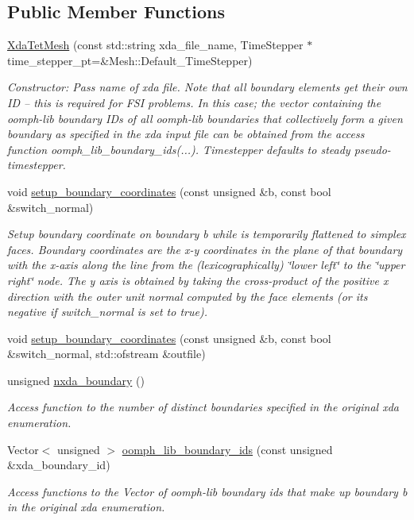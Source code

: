 \subsection*{Public Member Functions}
\begin{DoxyCompactItemize}
\item 
\hyperlink{classoomph_1_1XdaTetMesh_a4cea32a11d0899ac230de66899e503d1}{Xda\+Tet\+Mesh} (const std\+::string xda\+\_\+file\+\_\+name, Time\+Stepper $\ast$time\+\_\+stepper\+\_\+pt=\&Mesh\+::\+Default\+\_\+\+Time\+Stepper)
\begin{DoxyCompactList}\small\item\em Constructor\+: Pass name of xda file. Note that all boundary elements get their own ID -- this is required for F\+SI problems. In this case; the vector containing the oomph-\/lib boundary I\+Ds of all oomph-\/lib boundaries that collectively form a given boundary as specified in the xda input file can be obtained from the access function oomph\+\_\+lib\+\_\+boundary\+\_\+ids(...). Timestepper defaults to steady pseudo-\/timestepper. \end{DoxyCompactList}\item 
void \hyperlink{classoomph_1_1XdaTetMesh_a3a09ba1d3e29133dd032519ced703815}{setup\+\_\+boundary\+\_\+coordinates} (const unsigned \&b, const bool \&switch\+\_\+normal)
\begin{DoxyCompactList}\small\item\em Setup boundary coordinate on boundary b while is temporarily flattened to simplex faces. Boundary coordinates are the x-\/y coordinates in the plane of that boundary with the x-\/axis along the line from the (lexicographically) \char`\"{}lower left\char`\"{} to the \char`\"{}upper right\char`\"{} node. The y axis is obtained by taking the cross-\/product of the positive x direction with the outer unit normal computed by the face elements (or its negative if switch\+\_\+normal is set to true). \end{DoxyCompactList}\item 
void \hyperlink{classoomph_1_1XdaTetMesh_a415f0211f064766f8c38bca6f877c192}{setup\+\_\+boundary\+\_\+coordinates} (const unsigned \&b, const bool \&switch\+\_\+normal, std\+::ofstream \&outfile)
\item 
unsigned \hyperlink{classoomph_1_1XdaTetMesh_ad81712bc6c7215d64494ccafc8c99dd5}{nxda\+\_\+boundary} ()
\begin{DoxyCompactList}\small\item\em Access function to the number of distinct boundaries specified in the original xda enumeration. \end{DoxyCompactList}\item 
Vector$<$ unsigned $>$ \hyperlink{classoomph_1_1XdaTetMesh_ab690c0224586bfc7b46ff173da855ddd}{oomph\+\_\+lib\+\_\+boundary\+\_\+ids} (const unsigned \&xda\+\_\+boundary\+\_\+id)
\begin{DoxyCompactList}\small\item\em Access functions to the Vector of oomph-\/lib boundary ids that make up boundary b in the original xda enumeration. \end{DoxyCompactList}\end{DoxyCompactItemize}
